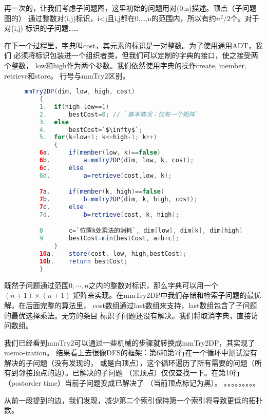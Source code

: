 再一次的，让我们考虑子问题图，这里初始的问题用对(0,n)描述。顶点（子问题图的）
通过整数对(i,j)标识，i<j且i,j都在0,…,n的范围内，所以有约$n^2/2$个。对于对(i,j)
标识的子问题……

在下一个过程里，字典叫cost，其元素的标识是一对整数。为了使用通用ADT，我们
必须将标识包装进一个组织者类，但我们可以定制的字典的接口，使之接受两个整数，
low和high作为两个参数。我们依然使用字典的操作create, member, retrieve和store。
行号与mmTry2区别。
\begin{figure}
\begin{lstlisting}[language={Java},keywordstyle=\color{blue!70}, commentstyle=\color{red!50!green!50!blue!50}]
    mmTry2DP(dim, low, high, cost)
    {
    1.  if(high-low==1)
    2.      bestCost=0; // `基本情况：仅有一个矩阵`
    3.  else
    4.      bestCost=`$\infty$`;
    5.  for(k=low+1; k<=high-1; k++)
        {
    6a.     if(member(low, k)==false)
    6b.         a=mmTry2DP(dim, low, k, cost);
    6c.     else
    6d.         a=retrieve(cost,low, k);

    7a.     if(member(k, high)==false)
    7b.         b=mmTry2DP(dim, k, high, cost);
    7c.     else
    7d.         b=retrieve(cost, k, high);

    8       c=`位置k处乘法的消耗`, dim[low], dim[k], dim[high]
    9       bestCost=min(bestCost, a+b+c);
        }
    10a.    store(cost, low, high,bestCost);
    10b.    return bestCost;
    }
\end{lstlisting}
\end{figure}

既然子问题通过范围$0, \cdots, n$之内的整数对标识，那么字典可以用一个$(n+1)\times (n+1)$
矩阵来实现。在mmTry2DP中我们存储和检索子问题的最优解。在后面完整的算法里，
cost数组通过last数组来支持，last数组包含了子问题的最优选择乘法。无穷的条目
标识子问题还没有解决。我们将取消字典，直接访问数组。

我们已经看到mmTry2可以通过一些机械的步骤就转换成mmTry2DP，其实现了memo-ization。
结果看上去很像DFS的框架：第6和第7行在一个循环中测试没有解决的子问题（没有发现的，
或是白顶点），这个循环遍历了所有需要的问题（所有到邻接顶点的边）。已解决的子问题
（黑顶点）仅仅查找一下。在第10行（postorder time）当前子问题变成已解决了
（当前顶点标记为黑）。
。。。。。。。。。

从前一段提到的边，我们发现，减少第二个索引保持第一个索引将导致更低的拓扑数。


